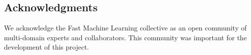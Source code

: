 \documentclass[utf8]{frontiersFPHY}
\begin{document}
\begin{spacing}{1.3}
\pagebreak
\section*{Acknowledgments}
We acknowledge the Fast Machine Learning collective as an open community of multi-domain experts and collaborators. 
This community was important for the development of this project. 


\clearpage


\end{spacing}
\end{document}
